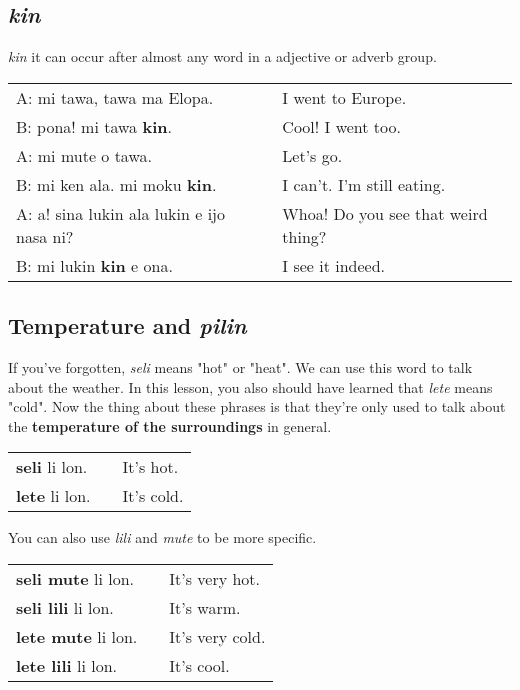 \subsection*{\textit{kin}}
%
\textit{kin} it can occur after almost any word in a adjective or adverb group. 

\begin{supertabular}{p{5,5cm}|ll}
A: mi tawa, tawa ma Elopa. && I went to Europe. \\
B: pona! mi tawa \textbf{kin}. && Cool! I went too. \\
A: mi mute o tawa. && Let's go. \\
B: mi ken ala. mi moku \textbf{kin}. && I can't. I'm still eating. \\
A: a! sina lukin ala lukin e ijo nasa ni? && Whoa! Do you see that weird thing? \\
B: mi lukin \textbf{kin} e ona. && I see it indeed. \\
\end{supertabular} 
%
\newpage
{}
\subsection*{Temperature and \textit{pilin}}
%
If you've forgotten, \textit{seli} means "hot" or "heat". 
We can use this word to talk about the weather. 
In this lesson, you also should have learned that \textit{lete} means "cold". 
Now the thing about these phrases is that they're only used to talk about the \textbf{temperature of the surroundings} in general. 

\begin{supertabular}{p{5,5cm}|ll}
\textbf{seli} li lon. && It's hot. \\
\textbf{lete} li lon. && It's cold. \\
\end{supertabular} 

You can also use \textit{lili} and \textit{mute} to be more specific. 
 
\begin{supertabular}{p{5,5cm}|ll}
\textbf{seli mute} li lon. && It's very hot. \\
\textbf{seli lili} li lon. && It's warm. \\
\textbf{lete mute} li lon. && It's very cold. \\
\textbf{lete lili} li lon. && It's cool. \\
\end{supertabular} 


